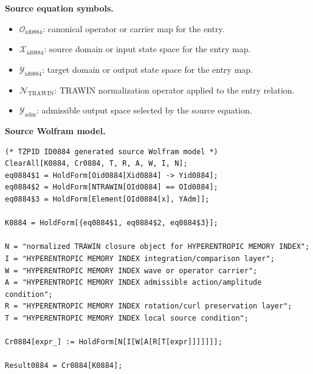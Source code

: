 \begin{minipage}[t]{0.49\linewidth}
\begingroup
\small
\raggedright
\textbf{Source equation symbols.}\par
\begin{itemize}[leftmargin=1.35em,itemsep=1pt,topsep=1pt,parsep=0pt]
    \item $\mathcal{O}_{\mathrm{id0884}}$: canonical operator or carrier map for the entry.
    \item $\mathcal{X}_{\mathrm{id0884}}$: source domain or input state space for the entry map.
    \item $\mathcal{Y}_{\mathrm{id0884}}$: target domain or output state space for the entry map.
    \item $\mathcal{N}_{\mathrm{TRAWIN}}$: TRAWIN normalization operator applied to the entry relation.
    \item $\mathcal{Y}_{\mathrm{adm}}$: admissible output space selected by the source equation.
\end{itemize}
\endgroup
\end{minipage}\hfill
\begin{minipage}[t]{0.47\linewidth}
\begingroup
\scriptsize
\raggedright
\textbf{Source Wolfram model.}\par
\begin{Verbatim}[fontsize=\tiny,breaklines=true,breakanywhere=true]
(* TZPID ID0884 generated source Wolfram model *)
ClearAll[K0884, Cr0884, T, R, A, W, I, N];
eq0884$1 = HoldForm[Oid0884[Xid0884] -> Yid0884];
eq0884$2 = HoldForm[NTRAWIN[OId0884] == OId0884];
eq0884$3 = HoldForm[Element[OId0884[x], YAdm]];

K0884 = HoldForm[{eq0884$1, eq0884$2, eq0884$3}];

N = "normalized TRAWIN closure object for HYPERENTROPIC MEMORY INDEX";
I = "HYPERENTROPIC MEMORY INDEX integration/comparison layer";
W = "HYPERENTROPIC MEMORY INDEX wave or operator carrier";
A = "HYPERENTROPIC MEMORY INDEX admissible action/amplitude condition";
R = "HYPERENTROPIC MEMORY INDEX rotation/curl preservation layer";
T = "HYPERENTROPIC MEMORY INDEX local source condition";

Cr0884[expr_] := HoldForm[N[I[W[A[R[T[expr]]]]]]];

Result0884 = Cr0884[K0884];
\end{Verbatim}
\endgroup
\end{minipage}

